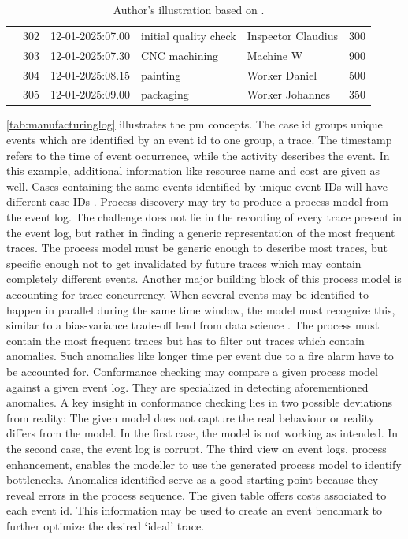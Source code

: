 \begin{table}[htbp]
{\begin{tabular}{r r l l l r}
                             & 302                     & 12-01-2025:07.00   & initial quality check & Inspector Claudius & 300           \\
                             & 303                     & 12-01-2025:07.30   & CNC machining         & Machine W          & 900           \\
                             & 304                     & 12-01-2025:08.15   & painting              & Worker Daniel      & 500           \\
                             & 305                     & 12-01-2025:09.00   & packaging             & Worker Johannes    & 350           \\
      \bottomrule
    \end{tabular}%
  }
  \caption*{Author's illustration based on \textcite{van2016data}.}
\end{table}

\autoref{tab:manufacturinglog} illustrates the \gls{pm} concepts. The case \gls{id} groups unique events which are identified by an event \gls{id} to one group, a trace. The timestamp refers to the time of event occurrence, while the activity describes the event. In this example, additional information like resource name and cost are given as well. Cases containing the same events identified by unique event IDs will have different case IDs \autocite{van2016data}. Process discovery may try to produce a process model from the event log. The challenge does not lie in the recording of every trace present in the event log, but rather in finding a generic representation of the most frequent traces. The process model must be generic enough to describe most traces, but specific enough not to get invalidated by future traces which may contain completely different events. Another major building block of this process model is accounting for trace concurrency. When several events may be identified to happen in parallel during the same time window, the model must recognize this, similar to a bias-variance trade-off lend from data science \autocite{briscoe2011conceptual}. The process must contain the most frequent traces but has to filter out traces which contain anomalies. Such anomalies like longer time per event due to a fire alarm have to be accounted for. Conformance checking may compare a given process model against a given event log. They are specialized in detecting aforementioned anomalies. A key insight in conformance checking lies in two possible deviations from reality: The given model does not capture the real behaviour or reality differs from the model. In the first case, the model is not working as intended. In the second case, the event log is corrupt. The third view on event logs, process enhancement, enables the modeller to use the generated process model to identify bottlenecks. Anomalies identified serve as a good starting point because they reveal errors in the process sequence. The given table offers costs associated to each event \gls{id}. This information may be used to create an event benchmark to further optimize the desired `ideal' trace.

